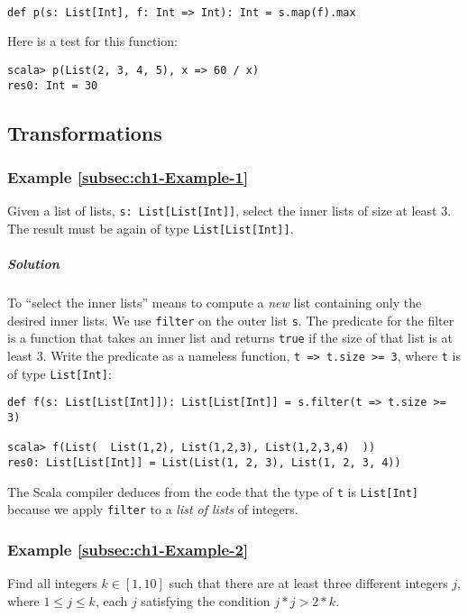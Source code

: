 ~

\begin{lstlisting}
def p(s: List[Int], f: Int => Int): Int = s.map(f).max
\end{lstlisting}
Here is a test for this function:
\begin{lstlisting}
scala> p(List(2, 3, 4, 5), x => 60 / x)
res0: Int = 30
\end{lstlisting}


\subsection{Transformations}

\subsubsection{Example \label{subsec:ch1-Example-1}\ref{subsec:ch1-Example-1}}

Given a list of lists, \lstinline!s: List[List[Int]]!, select the
inner lists of size at least $3$. The result must be again of type
\lstinline!List[List[Int]]!. 

\subparagraph{Solution}

To \textsf{``}select the inner lists\textsf{''} means to compute a \emph{new} list
containing only the desired inner lists. We use \texttt{}\lstinline!filter!
on the outer list \lstinline!s!. The predicate for the filter is
a function that takes an inner list and returns \texttt{}\lstinline!true!
if the size of that list is at least $3$. Write the predicate as
a nameless function, \lstinline!t => t.size >= 3!, where \texttt{}\lstinline!t!
is of type \lstinline!List[Int]!:
\begin{lstlisting}
def f(s: List[List[Int]]): List[List[Int]] = s.filter(t => t.size >= 3)

scala> f(List(  List(1,2), List(1,2,3), List(1,2,3,4)  ))
res0: List[List[Int]] = List(List(1, 2, 3), List(1, 2, 3, 4)) 
\end{lstlisting}
The Scala compiler deduces from the code that the type of \lstinline!t!
is \lstinline!List[Int]! because we apply \lstinline!filter! to
a \emph{list of lists} of integers.

\subsubsection{Example \label{subsec:ch1-Example-2}\ref{subsec:ch1-Example-2}}

Find all integers $k\in\left[1,10\right]$ such that there are at
least three different integers $j$, where $1\leq j\leq k$, each
$j$ satisfying the condition $j*j>2*k$.

